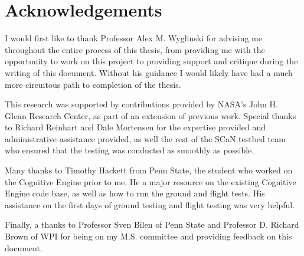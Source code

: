 \documentclass[12pt]{report}
\begin{document}
	\setlength{\parindent}{1.5em}

	\newpage
	
	\doublespacing
	

	
	\chapter*{Acknowledgements}
	 \par I would first like to thank Professor Alex M. Wyglinski for advising me throughout the entire process of this thesis, from providing me with the opportunity to work on this project to providing support and critique during the writing of this document. Without his guidance I would likely have had a much more circuitous path to completion of the thesis.  
	 \par This research was supported by contributions provided by NASA's John H. Glenn Research Center, as part of an extension of previous work. Special thanks to Richard Reinhart and Dale Mortensen for the expertise provided and administrative assistance provided, as well the rest of the SCaN testbed team who ensured that the testing was conducted as smoothly as possible.
	 \par Many thanks to Timothy Hackett from Penn State, the student who worked on the Cognitive Engine prior to me. He a major resource on the existing Cognitive Engine code base, as well as how to run the ground and flight tests. His assistance on the first days of ground testing and flight testing was very helpful. 
	 \par Finally, a thanks to Professor Sven Bilen of Penn State and Professor D. Richard Brown of WPI for being on my M.S. committee and providing feedback on this document. 


	 \clearpage
	
	\tableofcontents
	\listoffigures
	\listoftables
	
	\clearpage

	\setcounter{page}{1}
	
    
	
	
	
	
	
	\singlespacing
	\nocite{*}
	
	

	\begin{appendices}
	
	
	
	
	
	\end{appendices}

	
	
\end{document}
